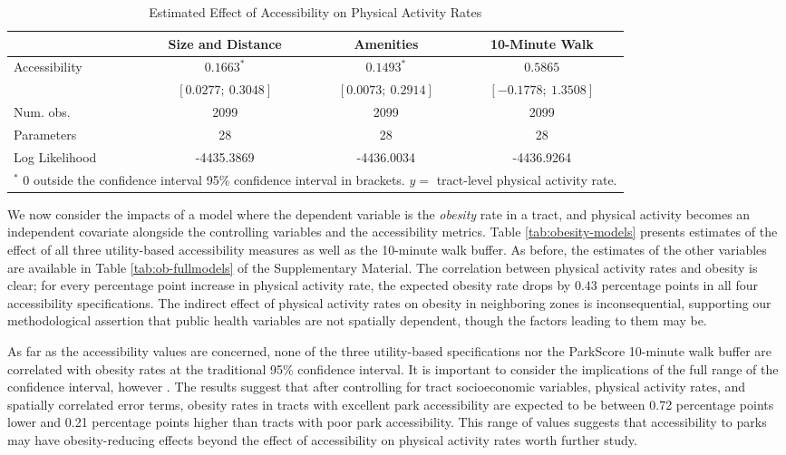 \documentclass[shortAfour,sageh.bst]{sagej}
\begin{document}
\begin{table*}
\caption{Estimated Effect of Accessibility on Physical Activity Rates}
\label{tab:pa-models}

\begin{tabular}{l c c c }
\toprule
 & Size and Distance & Amenities & 10-Minute Walk \\
\midrule
Accessibility  & $0.1663^{*}$        & $0.1493^{*}$        & $0.5865$             \\
               & $[0.0277;\ 0.3048]$ & $[0.0073;\ 0.2914]$ & $[-0.1778;\ 1.3508]$ \\
\midrule
Num. obs.      & 2099                & 2099                & 2099                 \\
Parameters     & 28                  & 28                  & 28                   \\
Log Likelihood & -4435.3869          & -4436.0034          & -4436.9264           \\
\bottomrule
\multicolumn{4}{l}{\scriptsize{$^*$ 0 outside the confidence interval 95\% confidence interval in brackets.  $y = $ tract-level physical activity rate.}}
\end{tabular}
\end{table*}

We now consider the impacts of a model where the dependent variable is
the \emph{obesity} rate in a tract, and physical activity becomes an
independent covariate alongside the controlling variables and the
accessibility metrics. Table \ref{tab:obesity-models} presents estimates
of the effect of all three utility-based accessibility measures as well
as the 10-minute walk buffer. As before, the estimates of the other
variables are available in Table \ref{tab:ob-fullmodels} of the
Supplementary Material. The correlation between physical activity rates
and obesity is clear; for every percentage point increase in physical
activity rate, the expected obesity rate drops by \(0.43\) percentage
points in all four accessibility specifications. The indirect effect of
physical activity rates on obesity in neighboring zones is
inconsequential, supporting our methodological assertion that public
health variables are not spatially dependent, though the factors leading
to them may be.

As far as the accessibility values are concerned, none of the three
utility-based specifications nor the ParkScore 10-minute walk buffer are
correlated with obesity rates at the traditional 95\% confidence
interval. It is important to consider the implications of the full range
of the confidence interval, however \citep{Amrhein2019}. The results
suggest that after controlling for tract socioeconomic variables,
physical activity rates, and spatially correlated error terms, obesity
rates in tracts with excellent park accessibility are expected to be
between 0.72 percentage points lower and 0.21 percentage points higher
than tracts with poor park accessibility. This range of values suggests
that accessibility to parks may have obesity-reducing effects beyond the
effect of accessibility on physical activity rates worth further study.
\end{document}
